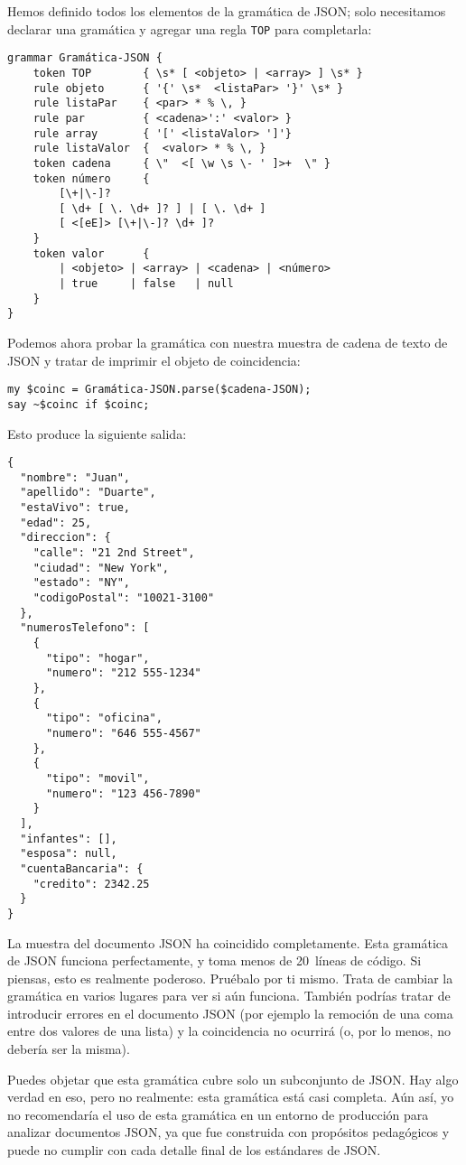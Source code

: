 Hemos definido todos los elementos de la gramática de JSON;
solo necesitamos declarar una gramática y agregar una regla
{\tt TOP} para completarla:

\begin{verbatim}
grammar Gramática-JSON {
	token TOP        { \s* [ <objeto> | <array> ] \s* }
	rule objeto      { '{' \s*  <listaPar> '}' \s* }
	rule listaPar    { <par> * % \, }
	rule par         { <cadena>':' <valor> }
	rule array       { '[' <listaValor> ']'}
	rule listaValor  {  <valor> * % \, }
	token cadena     { \"  <[ \w \s \- ' ]>+  \" }
	token número     {
		[\+|\-]?
		[ \d+ [ \. \d+ ]? ] | [ \. \d+ ]
		[ <[eE]> [\+|\-]? \d+ ]?
	}
	token valor      { 
		| <objeto> | <array> | <cadena> | <número> 
		| true     | false   | null 
	}
}
\end{verbatim}

Podemos ahora probar la gramática con nuestra muestra de 
cadena de texto de JSON y tratar de imprimir el objeto de
coincidencia:

\begin{verbatim}
my $coinc = Gramática-JSON.parse($cadena-JSON);
say ~$coinc if $coinc;
\end{verbatim}

Esto produce la siguiente salida:

\begin{verbatim}
{
  "nombre": "Juan",
  "apellido": "Duarte",
  "estaVivo": true,
  "edad": 25,
  "direccion": {
    "calle": "21 2nd Street",
    "ciudad": "New York",
    "estado": "NY",
    "codigoPostal": "10021-3100"
  },
  "numerosTelefono": [
    {
      "tipo": "hogar",
      "numero": "212 555-1234"
    },
    {
      "tipo": "oficina",
      "numero": "646 555-4567"
    },
    {
      "tipo": "movil",
      "numero": "123 456-7890"
    }
  ],
  "infantes": [],
  "esposa": null,  
  "cuentaBancaria": {
    "credito": 2342.25
  }
}
\end{verbatim}

La muestra del documento JSON ha coincidido completamente.
Esta gramática de JSON funciona perfectamente, y toma menos
de 20~líneas de código. Si piensas, esto es realmente poderoso.
Pruébalo por ti mismo. Trata de cambiar la gramática en varios
lugares para ver si aún funciona. También podrías tratar
de introducir errores en el documento JSON (por ejemplo la remoción
de una coma entre dos valores de una lista) y la coincidencia
no ocurrirá (o, por lo menos, no debería ser la misma).

Puedes objetar que esta gramática cubre solo un subconjunto de JSON.
Hay algo verdad en eso, pero no realmente: esta gramática está casi 
completa. Aún así, yo no recomendaría el uso de esta gramática
en un entorno de producción para analizar documentos JSON,
ya que fue construida con propósitos pedagógicos y puede no cumplir
con cada detalle final de los estándares de JSON.

